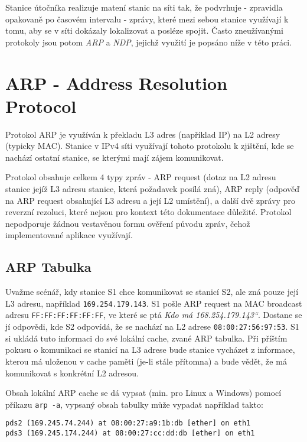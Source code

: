 \documentclass[a4paper, 11pt]{article}
\providecommand{\uv}[1]{\quotedblbase #1\textquotedblleft}
\begin{document}
	\par{Stanice útočníka realizuje matení stanic na síti tak, že podvrhuje \-- zpravidla opakovaně po časovém intervalu \-- zprávy, které mezi sebou stanice využívají k tomu, aby se v síti dokázaly lokalizovat a posléze spojit. Často zneužívanými protokoly jsou potom \textit{ARP} a \textit{NDP}, jejichž využití je popsáno níže v této práci.}


\section{ARP \-- Address Resolution Protocol}

\par{Protokol ARP je využíván k překladu L3 adres (například IP) na L2 adresy (typicky MAC). Stanice v IPv4 síti využívají tohoto protokolu k zjištění, kde se nachází ostatní stanice, se kterými mají zájem komunikovat.} 

\par{Protokol obsahuje celkem 4 typy zpráv \-- ARP request (dotaz na L2 adresu stanice jejíž L3 adresu stanice, která požadavek posílá zná), ARP reply (odpověď na ARP request obsahující L3 adresu a její L2 umístění), a další dvě zprávy pro reverzní rezoluci, které nejsou pro kontext této dokumentace důležité. Protokol nepodporuje žádnou vestavěnou formu ověření původu zpráv, čehož implementované aplikace využívají.}

\subsection{ARP Tabulka}
\par{Uvažme scénář, kdy stanice S1 chce komunikovat se stanicí S2, ale zná pouze její L3 adresu, například \texttt{169.254.179.143}. S1 pošle ARP request na MAC broadcast adresu \texttt{FF:FF:FF:FF:FF:FF}, ve které se ptá \textit{\uv{Kdo má 168.254.179.143}}. Dostane se jí odpovědi, kde S2 odpovídá, že se nachází na L2 adrese \texttt{08:00:27:56:97:53}. S1 si ukládá tuto informaci do své lokální cache, zvané ARP tabulka. Při příštím pokusu o komunikaci se stanicí na L3 adrese bude stanice vycházet z informace, kterou má uloženou v cache paměti (je-li stále přítomna) a bude vědět, že má komunikovat s konkrétní L2 adresou.}
\par{Obsah lokální ARP cache se dá vypsat (min. pro Linux a Windows) pomocí příkazu \texttt{arp -a}, vypsaný obsah tabulky může vypadat například takto:}
\begin{Verbatim}
pds2 (169.245.74.244) at 08:00:27:a9:1b:db [ether] on eth1
pds3 (169.245.174.244) at 08:00:27:cc:dd:db [ether] on eth1
\end{Verbatim}
\end{document}
